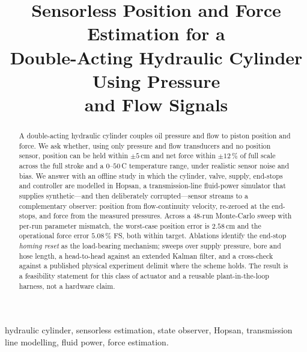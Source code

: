 \documentclass[conference]{IEEEtran}
\begin{document}
\title{Sensorless Position and Force Estimation for a\\
Double-Acting Hydraulic Cylinder Using Pressure\\
and Flow Signals}

\author{
}

\maketitle

\begin{abstract}
A double-acting hydraulic cylinder couples oil pressure and flow to piston
position and force. We ask whether, using only pressure and flow transducers and
no position sensor, position can be held within $\pm 5$\,cm and net force within
$\pm 12\,\%$ of full scale across the full stroke and a $0$--$50\,$\textdegree C
temperature range, under realistic sensor noise and bias. We answer with an
offline study in which the cylinder, valve, supply, end-stops and controller are
modelled in Hopsan, a transmission-line fluid-power simulator that supplies
synthetic---and then deliberately corrupted---sensor streams to a complementary
observer: position from flow-continuity velocity, re-zeroed at the end-stops, and
force from the measured pressures. Across a 48-run Monte-Carlo sweep with per-run
parameter mismatch, the worst-case position error is $2.58$\,cm and the
operational force error $5.08\,\%$ FS, both within target. Ablations identify the
end-stop \emph{homing reset} as the load-bearing mechanism; sweeps over supply
pressure, bore and hose length, a head-to-head against an extended Kalman filter,
and a cross-check against a published physical experiment delimit where the scheme
holds. The result is a feasibility statement for this class of actuator and a
reusable plant-in-the-loop harness, not a hardware claim.
\end{abstract}

\begin{IEEEkeywords}
hydraulic cylinder, sensorless estimation, state observer, Hopsan, transmission
line modelling, fluid power, force estimation.
\end{IEEEkeywords}
\end{document}
